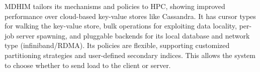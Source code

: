 MDHIM tailors its mechanisms and policies to HPC, showing improved performance
over cloud-based key-value stores like Cassandra. It has cursor types for
walking the key-value store, bulk operations for exploiting data locality,
per-job server spawning, and pluggable backends for its local database and
network type (infiniband/RDMA). Its policies are flexible, supporting
customized partitioning strategies and user-defined secondary indices. This
allows the system to choose whether to send load to the client or server.

